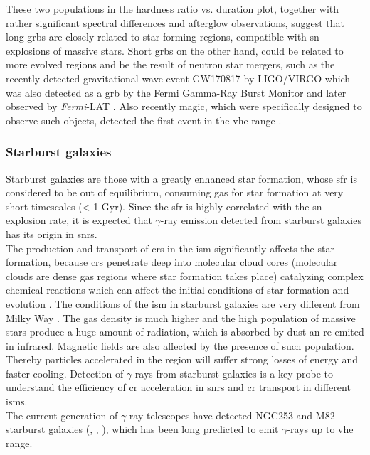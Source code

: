 \documentclass[main.tex]{subfiles}
\begin{document}
These two populations in the hardness ratio vs. duration plot, together with rather significant spectral differences \cite{2015GRBorigin} and afterglow observations, suggest that long \glspl{grb} are closely related to star forming regions, compatible with \gls{sn} explosions of massive stars. Short \glspl{grb} on the other hand, could be related to more evolved regions and be the result of neutron star mergers, such as the recently detected gravitational wave event GW170817 by LIGO/VIRGO \cite{2017GW170817} which was also detected as a \gls{grb} by the Fermi Gamma-Ray Burst Monitor and later observed by \textit{Fermi}-LAT \cite{2018FermiGW170817}. Also recently \gls{magic}, which were specifically designed to observe such objects, detected the first event in the \gls{vhe} range \cite{2019MAGICGRB}.

\subsubsection{Starburst galaxies}

Starburst galaxies are those with a greatly enhanced star formation, whose \gls{sfr} is considered to be out of equilibrium, consuming gas for star formation at very short timescales (< 1 Gyr). Since the \gls{sfr} is highly correlated with the \gls{sn} explosion rate, it is expected that $\gamma$-ray emission detected from starburst galaxies has its origin in \glspl{snr}.\\
The production and transport of \glspl{cr} in the \gls{ism} significantly affects the star formation, because \glspl{cr} penetrate deep into molecular cloud cores (molecular clouds are dense gas regions where star formation takes place) catalyzing complex chemical reactions which can affect the initial conditions of star formation and evolution \cite{2016starburst}. The conditions of the \gls{ism} in starburst galaxies are very different from Milky Way \cite{2009starbursthess}. The gas density is much higher and the high population of massive stars produce a huge amount of radiation, which is absorbed by dust an re-emited in infrared. Magnetic fields are also affected by the presence of such population. Thereby particles accelerated in the region will suffer strong losses of energy and faster cooling. Detection of $\gamma$-rays from starburst galaxies is a key probe to understand the efficiency of \gls{cr} acceleration in \glspl{snr} and \gls{cr} transport in different \glspl{ism}.  \\
The current generation of $\gamma$-ray telescopes have detected NGC253 and M82 starburst galaxies (\cite{2009starbursthess}, \cite{2009starburstveritas}, \cite{2010starburstFermi}), which has been long predicted to emit $\gamma$-rays up to \gls{vhe} range.\\
\end{document}
